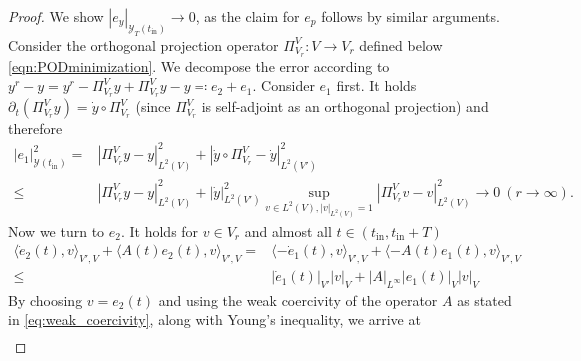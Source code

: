 \documentclass[10pt,a4paper]{amsart}
\newcommand{\ddt}{\partial_t}
\newcommand{\dt}{\mathrm{d}t}
\newcommand{\mY}{{\mathscr Y}}
\newcommand{\norm}[2]{\left|#1\right|_{#2}}
\newcommand{\tint}{t_{\mathrm{in}}}
\begin{document}
\begin{proof}
    We show $\norm{e_y}{\mY_T(\tint)}\to 0$, as the claim for $e_p$ follows by similar arguments. 
    Consider the orthogonal projection operator $\Pi^V_{V_r}:V\to V_r$ defined below \eqref{eqn:PODminimization}. We decompose the error according to $ y^r-y = y^r-\Pi^V_{V_r} y+\Pi^V_{V_r} y-y\eqqcolon e_2 + e_1$. Consider $e_1$ first. It holds $\ddt(\Pi^V_{V_r} y)= \dot y \circ \Pi^V_{V_r} $ (since $\Pi^V_{V_r}$ is self-adjoint as an orthogonal projection) and therefore
    \begin{align*}
        \norm{e_1}{\mY(\tint)}^2=&\norm{\Pi^V_{V_r} y-y}{L^2(V)}^2+\norm{\dot y \circ \Pi^V_{V_r} -\dot y}{L^2(V')}^2\\
        \leq &  \norm{\Pi^V_{V_r} y-y}{L^2(V)}^2+\norm{\dot y}{L^2(V')}^2\sup_{v\in L^2(V), \norm{v}{L^2(V)}=1}\norm{\Pi^V_{V_r}v-v}{L^2(V)}^2\to 0 \ (r\to \infty).
    \end{align*}
    Now we turn to $e_2$. It holds for $v\in V_r$ and almost all $t\in (\tint,\tint+T)$
    \begin{align}\label{eq:theo:galerkin_conv_help0}
        \langle\dot e_2(t),v\rangle_{V',V}+\langle A(t)e_2(t), v\rangle_{V',V}=& \langle-\dot e_1(t),v\rangle_{V',V}+\langle -A(t)e_1(t), v\rangle_{V',V}\\ \nonumber
        \leq & \norm{\dot e_1(t)}{V'}\norm{v}{V}+\norm{A}{L^\infty}\norm{e_1(t)}{V}\norm{v}{V}
    \end{align}
    By choosing $v=e_2(t)$ and using the weak coercivity of the operator $A$ as stated in \eqref{eq:weak_coercivity}, along with Young's inequality, we arrive at
    \begin{align}\label{eq:theo:galerkin_conv_help1}

\end{align}
\end{proof}
\end{document}
